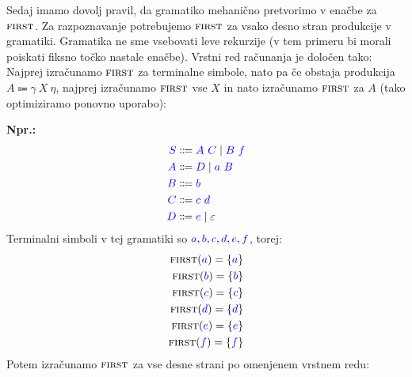 \documentclass{article}
\newcommand{\Ex}{\textbf{Npr.:}\ }
\newcommand{\FIRST}{\textsc{first}}
\newcommand{\Symbol}[1]{\textcolor{blue}{#1}}
\newcommand{\Null}{\varepsilon}
\newcommand{\Arrow}{\Coloneq}
\newcommand{\Seq}{\ }
\newcommand{\Union}{\mathrel{|}}
\begin{document}
Sedaj imamo dovolj pravil, da gramatiko mehanično pretvorimo v enačbe za $\FIRST$.
Za razpoznavanje potrebujemo $\FIRST$ za vsako desno stran produkcije v gramatiki.
Gramatika ne sme vsebovati leve rekurzije (v tem primeru bi morali poiskati fiksno točko nastale enačbe).
Vrstni red računanja je določen tako: Najprej izračunamo $\FIRST$ za terminalne simbole, nato pa če obstaja produkcija ${A \Arrow \gamma \Seq X \Seq \eta}$, najprej izračunamo $\FIRST$ vse $X$ in nato izračunamo $\FIRST$ za $A$ (tako optimiziramo ponovno uporabo):

\Ex
\begin{equation*}
  \begin{aligned}
    \Symbol{S} &\Arrow \Symbol{A} \Seq \Symbol{C} \Union \Symbol{B} \Seq \Symbol{f} \\
    \Symbol{A} &\Arrow \Symbol{D} \Union \Symbol{a} \Seq \Symbol{B} \\
    \Symbol{B} &\Arrow \Symbol{b}\\
    \Symbol{C} &\Arrow \Symbol{c} \Seq \Symbol{d}\\
    \Symbol{D} &\Arrow \Symbol{e} \Union \Null
  \end{aligned}
\end{equation*}
Terminalni simboli v tej gramatiki so $\Symbol{a}, \Symbol{b}, \Symbol{c}, \Symbol{d}, \Symbol{e}, \Symbol{f}$, torej:
\begin{align*}
  \FIRST(\Symbol{a}) = \{\Symbol{a}\}\\
  \FIRST(\Symbol{b}) = \{\Symbol{b}\}\\
  \FIRST(\Symbol{c}) = \{\Symbol{c}\}\\
  \FIRST(\Symbol{d}) = \{\Symbol{d}\}\\
  \FIRST(\Symbol{e}) = \{\Symbol{e}\}\\
  \FIRST(\Symbol{f}) = \{\Symbol{f}\}
\end{align*}
Potem izračunamo $\FIRST$ za vse desne strani po omenjenem vrstnem redu:
\end{document}
